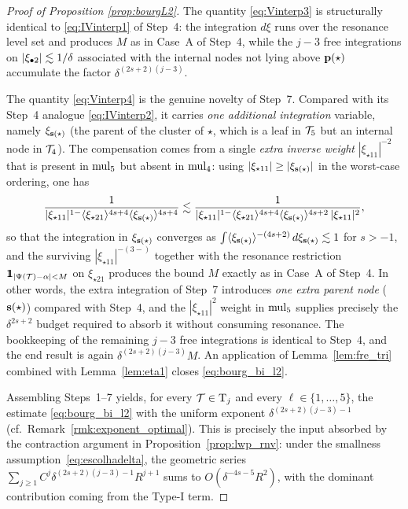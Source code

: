 \begin{proof}[Proof of Proposition \ref{prop:bourgL2}]
The quantity \eqref{eq:Vinterp3} is structurally identical to \eqref{eq:IVinterp1} of Step~4: the integration $d\xi$ runs over the resonance level set and produces $M$ as in Case~A of Step~4, while the $j-3$ free integrations on $|\xi_{\bullet 2}|\lesssim 1/\delta$ associated with the internal nodes not lying above $\mathbf{p}(\star)$ accumulate the factor $\delta^{(2s+2)(j-3)}$.

The quantity \eqref{eq:Vinterp4} is the genuine novelty of Step~7. Compared with its Step~4 analogue \eqref{eq:IVinterp2}, it carries \emph{one additional integration} variable, namely $\xi_{\mathbf{s}(\star)}$ (the parent of the cluster of $\star$, which is a leaf in $\mathcal{T}_5$ but an internal node in $\mathcal{T}_4$). The compensation comes from a single \emph{extra inverse weight} $|\xi_{\star 1 1}|^{-2}$ that is present in $\operatorname{mul}_5$ but absent in $\operatorname{mul}_4$: using $|\xi_{\star 1 1}|\ge |\xi_{\mathbf{s}(\star)}|$ in the worst-case ordering, one has
$$
\frac{1}{|\xi_{\star 1 1}|^{1-}\langle \xi_{\star 2 1} \rangle^{4s+4}\langle \xi_{\mathbf{s}(\star)} \rangle^{4s+4}} \lesssim \frac{1}{|\xi_{\star 1 1}|^{1-}\langle \xi_{\star 2 1} \rangle^{4s+4}\langle \xi_{\mathbf{s}(\star)} \rangle^{4s+2}\,|\xi_{\star11}|^{2}},
$$
so that the integration in $\xi_{\mathbf{s}(\star)}$ converges as $\int\langle \xi_{\mathbf{s}(\star)} \rangle^{-(4s+2)}\,d\xi_{\mathbf{s}(\star)}\lesssim 1$ for $s>-1$, and the surviving $|\xi_{\star 1 1}|^{-(3-)}$ together with the resonance restriction $\ind_{|\Psi(\TT)-\alpha|<M}$ on $\xi_{\star 2 1}$ produces the bound $M$ exactly as in Case~A of Step~4. In other words, the extra integration of Step~7 introduces \emph{one extra parent node} ($\mathbf{s}(\star)$) compared with Step~4, and the $|\xi_{\star11}|^{2}$ weight in $\operatorname{mul}_5$ supplies precisely the $\delta^{2s+2}$ budget required to absorb it without consuming resonance. The bookkeeping of the remaining $j-3$ free integrations is identical to Step~4, and the end result is again $\delta^{(2s+2)(j-3)}M$. An application of Lemma~\ref{lem:fre_tri} combined with Lemma~\ref{lem:eta1} closes \eqref{eq:bourg_bi_l2}.

\medskip

Assembling Steps~1--7 yields, for every $\mathcal{T}\in\mathrm{T}_j$ and every $\ell\in\{1,\dots,5\}$, the estimate \eqref{eq:bourg_bi_l2} with the uniform exponent $\delta^{(2s+2)(j-3)-1}$ (cf.\ Remark~\ref{rmk:exponent_optimal}). This is precisely the input absorbed by the contraction argument in Proposition~\ref{prop:lwp_rnv}: under the smallness assumption~\eqref{eq:escolhadelta}, the geometric series $\sum_{j\ge 1} C^j \delta^{(2s+2)(j-3)-1} R^{j+1}$ sums to $O(\delta^{-4s-5}R^2)$, with the dominant contribution coming from the Type-I term.
\end{proof}
